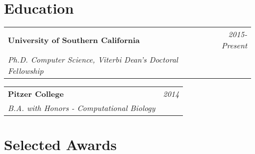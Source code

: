\documentclass[10pt,a4paper]{article}
\begin{document}
  \newpage

  \vspace*{-15mm}\section*{Education}

  \vspace*{0mm}\noindent\begin{tabularx}{17cm}{X r}
    \textbf{University of Southern California} & \textit{2015-Present} \\
    \textit{Ph.D. Computer Science, Viterbi Dean's Doctoral Fellowship}
  \end{tabularx} 

  \vspace*{1mm}\noindent\begin{tabularx}{17cm}{X r}
    \textbf{Pitzer College} & \textit{2014} \\
    \textit{B.A. with Honors - Computational Biology}
  \end{tabularx}



  \vspace*{2mm}\section*{Selected Awards}
  
\end{document}
